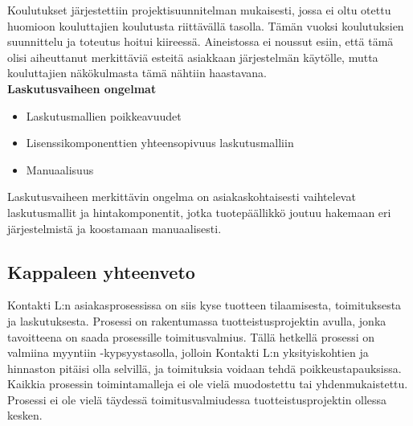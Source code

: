 \documentclass[finnish,12pt,a4paper,pdftex]{article}
\begin{document}
Koulutukset järjestettiin projektisuunnitelman mukaisesti, jossa ei oltu otettu huomioon kouluttajien koulutusta riittävällä tasolla. Tämän vuoksi koulutuksien suunnittelu ja toteutus hoitui kiireessä. Aineistossa ei noussut esiin, että tämä olisi aiheuttanut merkittäviä esteitä asiakkaan järjestelmän käytölle, mutta kouluttajien näkökulmasta tämä nähtiin haastavana.\\

\textbf{Laskutusvaiheen ongelmat}\\

\begin{itemize}
    \item Laskutusmallien poikkeavuudet
    \item Lisenssikomponenttien yhteensopivuus laskutusmalliin
    \item Manuaalisuus
\end{itemize}

Laskutusvaiheen merkittävin ongelma on asiakaskohtaisesti vaihtelevat laskutusmallit ja hintakomponentit, jotka tuotepäällikkö joutuu hakemaan eri järjestelmistä ja koostamaan manuaalisesti. 



\subsection{Kappaleen yhteenveto}

Kontakti L:n asiakasprosessissa on siis kyse tuotteen tilaamisesta, toimituksesta ja laskutuksesta. Prosessi on rakentumassa tuotteistusprojektin avulla, jonka tavoitteena on saada prosessille toimitusvalmius. Tällä hetkellä prosessi on valmiina myyntiin -kypsyystasolla, jolloin Kontakti L:n yksityiskohtien ja hinnaston pitäisi olla selvillä, ja toimituksia voidaan tehdä poikkeustapauksissa. Kaikkia prosessin toimintamalleja ei ole vielä muodostettu tai yhdenmukaistettu. Prosessi ei ole vielä täydessä toimitusvalmiudessa tuotteistusprojektin ollessa kesken.\\
\end{document}
